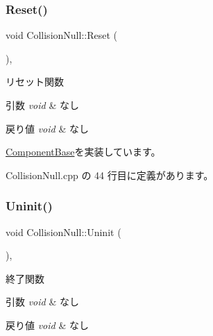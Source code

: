 \subsubsection{\texorpdfstring{Reset()}{Reset()}}
{\footnotesize\ttfamily void Collision\+Null\+::\+Reset (\begin{DoxyParamCaption}{ }\end{DoxyParamCaption})\hspace{0.3cm}{\ttfamily [override]}, {\ttfamily [virtual]}}



リセット関数 


\begin{DoxyParams}{引数}
{\em void} & なし \\
\hline
\end{DoxyParams}

\begin{DoxyRetVals}{戻り値}
{\em void} & なし \\
\hline
\end{DoxyRetVals}


\mbox{\hyperlink{class_component_base_a484df9edcbe83b1a98aacc55b50bfdda}{Component\+Base}}を実装しています。



 Collision\+Null.\+cpp の 44 行目に定義があります。

\mbox{\label{class_collision_null_aafac3fdab43845465fd1e0198c423ccf}} 
\subsubsection{\texorpdfstring{Uninit()}{Uninit()}}
{\footnotesize\ttfamily void Collision\+Null\+::\+Uninit (\begin{DoxyParamCaption}{ }\end{DoxyParamCaption})\hspace{0.3cm}{\ttfamily [override]}, {\ttfamily [virtual]}}



終了関数 


\begin{DoxyParams}{引数}
{\em void} & なし \\
\hline
\end{DoxyParams}

\begin{DoxyRetVals}{戻り値}
{\em void} & なし \\
\hline
\end{DoxyRetVals}


